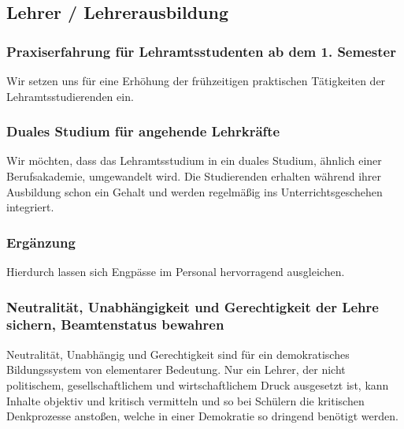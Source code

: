 \subsection*{Lehrer / Lehrerausbildung}

\subsubsection{Praxiserfahrung für Lehramtsstudenten ab dem 1. Semester}
\abstimmung
Wir setzen uns für eine Erhöhung der frühzeitigen praktischen Tätigkeiten der Lehramtsstudierenden ein.
 

\subsubsection{Duales Studium für angehende Lehrkräfte}
\abstimmung
Wir möchten, dass das Lehramtsstudium in ein duales Studium, ähnlich einer Berufsakademie, umgewandelt wird. Die Studierenden erhalten während ihrer Ausbildung schon ein Gehalt und werden regelmäßig ins Unterrichtsgeschehen integriert.

\subsubsection{Ergänzung}
\abstimmung
Hierdurch lassen sich Engpässe im Personal hervorragend ausgleichen.
 
\label{wp:bildung:neutralitaet}

\subsubsection{Neutralität, Unabhängigkeit und Gerechtigkeit der Lehre sichern, Beamtenstatus bewahren}
\abstimmung
Neutralität, Unabhängig und Gerechtigkeit sind für ein demokratisches Bildungssystem von elementarer Bedeutung. Nur ein Lehrer, der nicht politischem, gesellschaftlichem und wirtschaftlichem Druck ausgesetzt ist, kann Inhalte objektiv und kritisch vermitteln und so bei Schülern die kritischen Denkprozesse anstoßen, welche in einer Demokratie so dringend benötigt werden.

